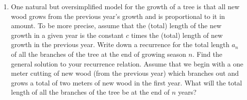 \begin{enumerate}
\item One natural but oversimplified model for the growth of a tree is
that all new wood grows  from the previous year's growth and is
proportional to it in amount.  To be more precise, assume that the
(total) length of the new growth in a given year is the constant $c$
times the (total) length of new growth in the previous year.  Write down
a recurrence for the total length $a_n$ of all the branches of the tree
at the end of growing season
$n$.  Find the general solution to your recurrence relation.  Assume that
we begin with a one meter cutting of new wood (from the previous year) which
branches out and grows a total of two meters of new wood in the first year. 
What will the total length of all the branches of the tree be at the end of $n$
years?


\end{enumerate}
